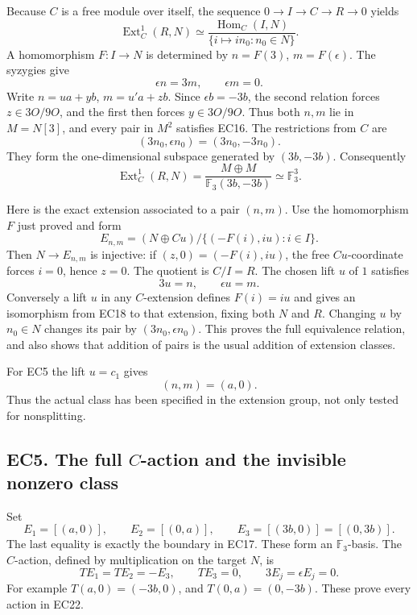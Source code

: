\documentclass[
  10pt,
  a4paper,
]{article}
\begin{document}
Because \(C\) is a free module over itself, the sequence
\(0\to I\to C\to R\to0\) yields \[
\operatorname{Ext}^1_C(R,N)
\simeq
\frac{\operatorname{Hom}_C(I,N)}
{\{i\mapsto in_0:n_0\in N\}}.
\] A homomorphism \(F:I\to N\) is determined by \(n=F(3)\),
\(m=F(\epsilon)\). The syzygies give \[
\epsilon n=3m,\qquad\epsilon m=0.
\tag{EC16}
\] Write \(n=u a+y b\), \(m=u'a+z b\). Since \(\epsilon b=-3b\), the
second relation forces \(z\in3O/9O\), and the first then forces
\(y\in3O/9O\). Thus both \(n,m\) lie in \(M=N[3]\), and every pair in
\(M^2\) satisfies EC16. The restrictions from \(C\) are \[
(3n_0,\epsilon n_0)=(3n_0,-3n_0).
\] They form the one-dimensional subspace generated by \((3b,-3b)\).
Consequently \[
\boxed{\operatorname{Ext}^1_C(R,N)
=\frac{M\oplus M}{\mathbb F_3(3b,-3b)}
\simeq\mathbb F_3^3.}
\tag{EC17}
\]

Here is the exact extension associated to a pair \((n,m)\). Use the
homomorphism \(F\) just proved and form \[
E_{n,m}=(N\oplus C u)/\{(-F(i),iu):i\in I\}.
\tag{EC18}
\] Then \(N\to E_{n,m}\) is injective: if \((z,0)=(-F(i),iu)\), the free
\(C u\)-coordinate forces \(i=0\), hence \(z=0\). The quotient is
\(C/I=R\). The chosen lift \(u\) of \(1\) satisfies \[
3u=n,\qquad\epsilon u=m.
\tag{EC19}
\] Conversely a lift \(u\) in any \(C\)-extension defines \(F(i)=iu\)
and gives an isomorphism from EC18 to that extension, fixing both \(N\)
and \(R\). Changing \(u\) by \(n_0\in N\) changes its pair by
\((3n_0,\epsilon n_0)\). This proves the full equivalence relation, and
also shows that addition of pairs is the usual addition of extension
classes.

For EC5 the lift \(u=c_1\) gives \[
(n,m)=(a,0).
\tag{EC20}
\] Thus the actual class has been specified in the extension group, not
only tested for nonsplitting.

\subsection{\texorpdfstring{EC5. The full \(C\)-action and the invisible
nonzero
class}{EC5. The full C-action and the invisible nonzero class}}\label{ec5.-the-full-c-action-and-the-invisible-nonzero-class}

Set \[
E_1=[(a,0)],\qquad E_2=[(0,a)],\qquad
E_3=[(3b,0)]=[(0,3b)].
\tag{EC21}
\] The last equality is exactly the boundary in EC17. These form an
\(\mathbb F_3\)-basis. The \(C\)-action, defined by multiplication on
the target \(N\), is \[
TE_1=TE_2=-E_3,\qquad TE_3=0,\qquad
3E_j=\epsilon E_j=0.
\tag{EC22}
\] For example \(T(a,0)=(-3b,0)\), and \(T(0,a)=(0,-3b)\). These prove
every action in EC22.
\end{document}
